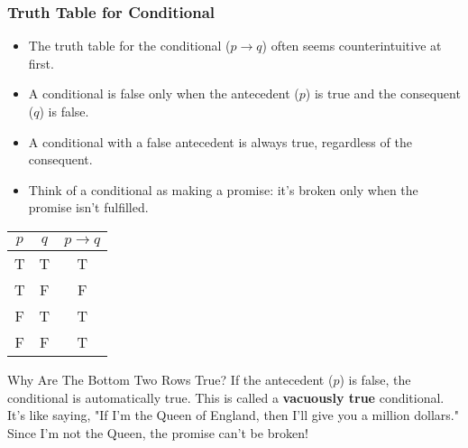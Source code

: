 \documentclass{beamer}
\begin{document}
                    \begin{frame}
                    \frametitle{Truth Table for Conditional}
                    \begin{itemize}
                        \item The truth table for the conditional ($p \rightarrow q$) often seems counterintuitive at first.
                        \item A conditional is false only when the antecedent ($p$) is true and the consequent ($q$) is false.
                        \item A conditional with a false antecedent is always true, regardless of the consequent.
                        \item Think of a conditional as making a promise: it's broken only when the promise isn't fulfilled.
                    \end{itemize}
                    
                    \begin{center}
                        \scriptsize
                    \begin{tabular}{|c|c|c|}
                    \hline
                    $p$ & $q$ & $p \rightarrow q$ \\
                    \hline
                    T & T & T \\
                    \hline
                    T & F & F \\
                    \hline
                    F & T & T \\
                    \hline
                    F & F & T \\
                    \hline
                    \end{tabular}
                    \end{center}
                    
                    \begin{alertblock}{Why Are The Bottom Two Rows True?}
                        \scriptsize
                    If the antecedent ($p$) is false, the conditional is automatically true. This is called a \textbf{vacuously true} conditional. It's like saying, "If I'm the Queen of England, then I'll give you a million dollars." Since I'm not the Queen, the promise can't be broken!
                    \end{alertblock}
                    \end{frame}
                    
\end{document}
